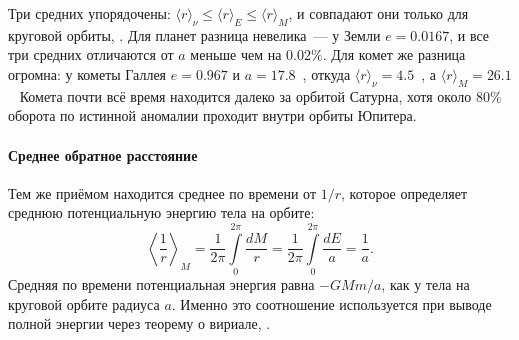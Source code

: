 Три средних упорядочены: $\langle r \rangle_\nu \leqslant \langle r \rangle_E \leqslant \langle r \rangle_M$, и совпадают они только для круговой орбиты, . Для планет разница невелика~--- у Земли $e = 0.0167$, и все три средних отличаются от $a$ меньше чем на $0.02\%$. Для комет же разница огромна: у кометы Галлея $e = 0.967$ и $a = 17.8$~\au, откуда $\langle r \rangle_\nu = 4.5$~\au, а $\langle r \rangle_M = 26.1$~\au{} Комета почти всё время находится далеко за орбитой Сатурна, хотя около $80\%$ оборота по истинной аномалии проходит внутри орбиты Юпитера.

\paragraph{Среднее обратное расстояние} Тем же приёмом находится среднее по времени от $1/r$, которое определяет среднюю потенциальную энергию тела на орбите:
\begin{equation*}
    \left\langle \frac{1}{r} \right\rangle_M
    = \frac{1}{2\pi}\int\limits_0^{2\pi} \frac{dM}{r}
    = \frac{1}{2\pi}\int\limits_0^{2\pi} \frac{dE}{a}
    = \frac{1}{a}.
\end{equation*}
Средняя по времени потенциальная энергия равна $-GMm / a$, как у тела на круговой орбите радиуса $a$. Именно это соотношение используется при выводе полной энергии через теорему о вириале, .
